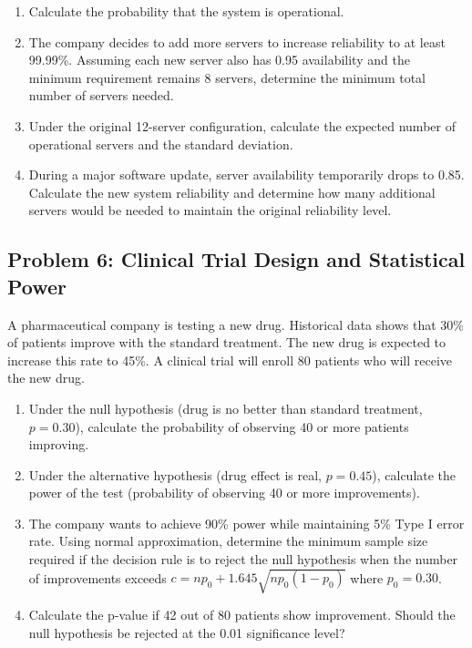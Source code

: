 \documentclass[12pt]{article}
\begin{document}
\begin{enumerate}[label=(\alph*)]
\item Calculate the probability that the system is operational.

\item The company decides to add more servers to increase reliability to at least 99.99\%. Assuming each new server also has 0.95 availability and the minimum requirement remains 8 servers, determine the minimum total number of servers needed.

\item Under the original 12-server configuration, calculate the expected number of operational servers and the standard deviation.

\item During a major software update, server availability temporarily drops to 0.85. Calculate the new system reliability and determine how many additional servers would be needed to maintain the original reliability level.
\end{enumerate}

\subsection*{Problem 6: Clinical Trial Design and Statistical Power}

A pharmaceutical company is testing a new drug. Historical data shows that 30\% of patients improve with the standard treatment. The new drug is expected to increase this rate to 45\%. A clinical trial will enroll 80 patients who will receive the new drug.

\begin{enumerate}[label=(\alph*)]
\item Under the null hypothesis (drug is no better than standard treatment, \(p = 0.30\)), calculate the probability of observing 40 or more patients improving.

\item Under the alternative hypothesis (drug effect is real, \(p = 0.45\)), calculate the power of the test (probability of observing 40 or more improvements).

\item The company wants to achieve 90\% power while maintaining 5\% Type I error rate. Using normal approximation, determine the minimum sample size required if the decision rule is to reject the null hypothesis when the number of improvements exceeds \(c = np_0 + 1.645\sqrt{np_0(1-p_0)}\) where \(p_0 = 0.30\).

\item Calculate the p-value if 42 out of 80 patients show improvement. Should the null hypothesis be rejected at the 0.01 significance level?
\end{enumerate}
\end{document}
